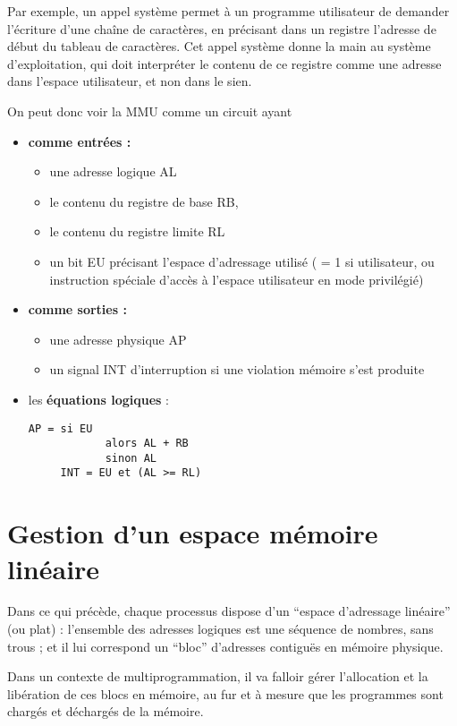 \begin{multicols}{2}
Par exemple, un appel système permet à un programme utilisateur de
demander l'écriture d'une chaîne de caractères, en précisant dans un
registre l'adresse de début du tableau de caractères.  Cet appel
système donne la main au système d'exploitation, qui doit interpréter
le contenu de ce registre comme une adresse dans l'espace utilisateur,
et non dans le sien.

On peut donc voir la MMU comme un circuit ayant
\begin{itemize}
\item \textbf{comme entrées :}
\begin{itemize}
\item une adresse logique AL
\item le contenu du registre de base RB,
\item le contenu du registre limite RL
\item un bit EU précisant l'espace d'adressage utilisé ( = 1 si 
utilisateur, ou instruction spéciale d'accès à l'espace 
utilisateur en mode privilégié)
\end{itemize}
\item \textbf{comme sorties :} 
\begin{itemize}
\item une adresse physique AP
\item un signal INT d'interruption si une violation mémoire s'est 
produite
\end{itemize}
\item les \textbf{équations logiques}  :

\begin{lstlisting}[frame=single]
     AP = si EU
            alors AL + RB
            sinon AL
     INT = EU et (AL >= RL)
\end{lstlisting}
\end{itemize}



\section{Gestion d'un espace mémoire linéaire}

Dans ce qui précède, chaque processus dispose d'un ``espace d'adressage
linéaire'' (ou plat) : l'ensemble des adresses logiques est une
séquence de nombres, sans trous ; et il lui correspond un ``bloc''
d'adresses contiguës en mémoire physique.


Dans un contexte de multiprogrammation, il va falloir gérer
l'allocation et la libération de ces blocs en mémoire, au fur
et à mesure que les programmes sont chargés et déchargés de la mémoire.


\end{multicols}

